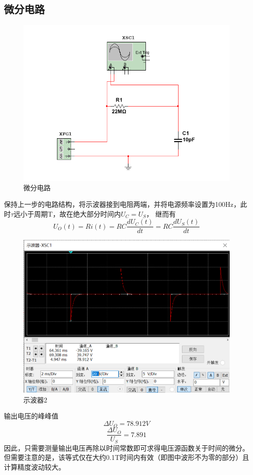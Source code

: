 \documentclass{ctexart}
\begin{document}
\subsection{微分电路}
\begin{figure}
    \centering
    \includegraphics{pic/微分电路.png}
    \caption{微分电路}
    \label{fig:微分电路}
\end{figure}
保持上一步的电路结构，将示波器接到电阻两端，并将电源频率设置为100Hz，此时$\tau$远小于周期T，故在绝大部分时间内$U_C=U_S$，
继而有
\begin{equation}
    U_O(t)=Ri(t)=RC\dfrac{dU_C(t)}{dt}=RC\dfrac{dU_S(t)}{dt}
\end{equation}
\begin{figure}
    \centering
    \includegraphics{pic/示波器2.png}
    \caption{示波器2}
    \label{fig:示波器2}
\end{figure}
输出电压的峰峰值
\begin{equation}
    \Delta U_O = 78.912V 
\end{equation}
\begin{equation}
    \dfrac{\Delta U_O}{U_S}=7.891
\end{equation}
因此，只需要测量输出电压再除以时间常数即可求得电压源函数关于时间的微分。但需要注意的是，该等式仅在大约0.1T时间内有效（即图中波形不为零的部分）且计算精度波动较大。
\end{document}

